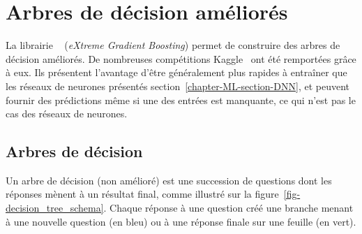 \section{Arbres de décision améliorés}\label{chapter-ML-section-XGB}
La librairie
\XGBOOST~\cite{xgboost}
(\emph{eXtreme Gradient Boosting})
permet de construire des
arbres de décision améliorés.
De nombreuses compétitions Kaggle~\cite{kaggle_challenge} ont été remportées grâce à eux.
Ils présentent l'avantage d'être généralement plus rapides à entraîner que les réseaux de neurones présentés section~\ref{chapter-ML-section-DNN},
et peuvent fournir des prédictions même si une des entrées est manquante, ce qui n'est pas le cas des réseaux de neurones.
\subsection{Arbres de décision}\label{chapter-ML-section-XGB-decision_trees}
Un arbre de décision (non amélioré) est une succession de questions
dont les réponses mènent à un résultat final,
comme illustré sur la figure~\ref{fig-decision_tree_schema}.
Chaque réponse à une question créé une \og branche \fg{} menant à une nouvelle question (en bleu)
ou à une réponse finale sur une \og feuille \fg{} (en vert).
